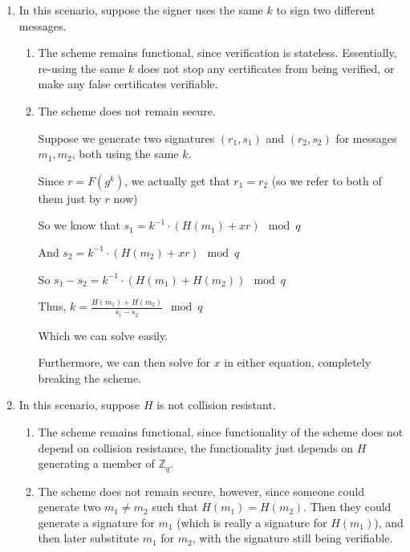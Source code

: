     \begin{enumerate}
      \item

        In this scenario, suppose the signer uses the same $k$ to sign two different messages.

        \begin{enumerate}

          \item
            The scheme remains functional, since verification is stateless. Essentially, re-using the same $k$ does not stop any certificates from being verified, or make any false certificates verifiable.
          \item
            The scheme does not remain secure.

            Suppose we generate two signatures $(r_1, s_1)$ and $(r_2, s_2)$ for messages $m_1, m_2$, both using the same $k$.

            Since $r = F(g^k)$, we actually get that $r_1 = r_2$ (so we refer to both of them just by $r$ now)

            So we know that $s_1 = k^{-1} \cdot (H(m_1) + xr) \mod q$

            And $s_2 = k^{-1} \cdot (H(m_2) + xr) \mod q$

            So $s_1 - s_2 = k^{-1} \cdot (H(m_1) + H(m_2)) \mod q$

            Thus, $k = \frac{H(m_1) + H(m_2)}{s_1 - s_2} \mod q$

            Which we can solve easily.

            Furthermore, we can then solve for $x$ in either equation, completely breaking the scheme.
        \end{enumerate}

      \item
        In this scenario, suppose $H$ is not collision resistant.

        \begin{enumerate}
          \item
            The scheme remains functional, since functionality of the scheme does not depend on collision resistance, the functionality just depends on $H$ generating a member of $\mathbb{Z}_q$.

          \item
            The scheme does not remain secure, however, since someone could generate two $m_1 \neq m_2$ such that $H(m_1) = H(m_2)$. Then they could generate a signature for $m_1$ (which is really a signature for $H(m_1)$), and then later substitute $m_1$ for $m_2$, with the signature still being verifiable.
        \end{enumerate}


\end{enumerate}
